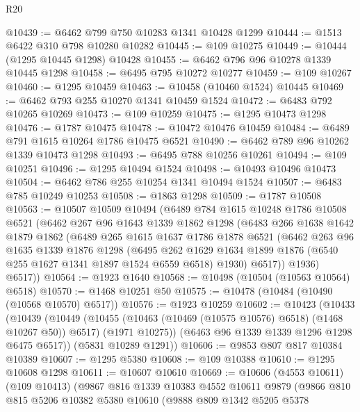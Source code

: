 \begin{lexlean}{R20}
\begin{coremodule}
@10439 := @6462 @799 @750 @10283 @1341 @10428 @1299
@10444 := @1513 @6422 @310 @798 @10280 @10282
@10445 := @109 @10275
@10449 := @10444 (@1295 @10445 @1298) @10428
@10455 := @6462 @796 @96 @10278 @1339 @10445 @1298
@10458 := @6495 @795 @10272 @10277
@10459 := @109 @10267
@10460 := @1295 @10459
@10463 := @10458 (@10460 @1524) @10445
@10469 := @6462 @793 @255 @10270 @1341 @10459 @1524
@10472 := @6483 @792 @10265 @10269
@10473 := @109 @10259
@10475 := @1295 @10473 @1298
@10476 := @1787 @10475
@10478 := @10472 @10476 @10459
@10484 := @6489 @791 @1615 @10264 @1786 @10475 @6521
@10490 := @6462 @789 @96 @10262 @1339 @10473 @1298
@10493 := @6495 @788 @10256 @10261
@10494 := @109 @10251
@10496 := @1295 @10494 @1524
@10498 := @10493 @10496 @10473
@10504 := @6462 @786 @255 @10254 @1341 @10494 @1524
@10507 := @6483 @785 @10249 @10253
@10508 := @1863 @1298
@10509 := @1787 @10508
@10563 := @10507
    @10509
    @10494
    (@6489
      @784
      @1615
      @10248
      @1786
      @10508
      @6521
      (@6462
        @267
        @96
        @1643
        @1339
        @1862
        @1298
        (@6483
          @266
          @1638
          @1642
          @1879
          @1862
          (@6489
            @265
            @1615
            @1637
            @1786
            @1878
            @6521
            (@6462
              @263
              @96
              @1635
              @1339
              @1876
              @1298
              (@6495
                @262
                @1629
                @1634
                @1899
                @1876
                (@6540 @255 @1627 @1341 @1897 @1524 @6559 @6518)
                @1930)
              @6517))
          @1936)
        @6517))
@10564 := @1923 @1640
@10568 := @10498 (@10504 (@10563 @10564) @6518)
@10570 := @1468 @10251 @50
@10575 := @10478 (@10484 (@10490 (@10568 @10570) @6517))
@10576 := @1923 @10259
@10602 := @10423
    (@10433
      (@10439
        (@10449
          (@10455 (@10463 (@10469 (@10575 @10576) @6518) (@1468 @10267 @50)) @6517)
          (@1971 @10275))
        (@6463 @96 @1339 @1339 @1296 @1298 @6475 @6517))
      (@5831 @10289 @1291))
@10606 := @9853 @807 @817 @10384 @10389
@10607 := @1295 @5380
@10608 := @109 @10388
@10610 := @1295 @10608 @1298
@10611 := @10607 @10610
@10669 := @10606
    (@4553 @10611)
    (@109 @10413)
    (@9867
      @816
      @1339
      @10383
      @4552
      @10611
      @9879
      (@9866
        @810
        @815
        @5206
        @10382
        @5380
        @10610
        (@9888
          @809
          @1342
          @5205
          @5378

\end{coremodule}
\end{lexlean}
